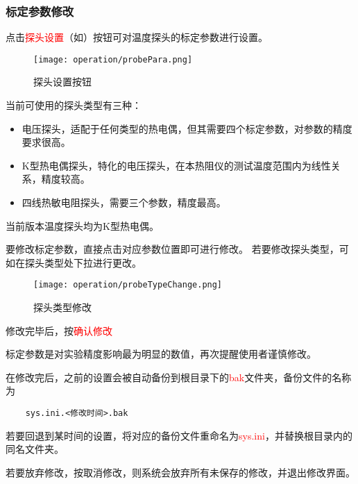 \subsubsection*{标定参数修改}
点击\textcolor{red}{探头设置}（如）按钮可对温度探头的标定参数进行设置。
\begin{figure}[H]
    \centering
    \texttt{[image: operation/probePara.png]}
    \caption{  探头设置按钮 \label{fig:btnProbePara}}
\end{figure}
当前可使用的探头类型有三种：
\begin{itemize}
    \item 电压探头，适配于任何类型的热电偶，但其需要四个标定参数，对参数的精度要求很高。
    \item K型热电偶探头，特化的电压探头，在本热阻仪的测试温度范围内为线性关系，精度较高。
    \item 四线热敏电阻探头，需要三个参数，精度最高。
\end{itemize}
\begin{note}
    当前版本温度探头均为K型热电偶。
\end{note}
要修改标定参数，直接点击对应参数位置即可进行修改。
若要修改探头类型，可如在探头类型处下拉进行更改。
\begin{figure}[H]
    \centering
    \texttt{[image: operation/probeTypeChange.png]}
    \caption{  探头类型修改 \label{fig:probeTypeChange}}
\end{figure}
修改完毕后，按\textcolor{red}{确认修改}
\begin{note}
    标定参数是对实验精度影响最为明显的数值，再次提醒使用者谨慎修改。
\end{note}
在修改完后，之前的设置会被自动备份到根目录下的\textcolor{red}{bak}文件夹，备份文件的名称为
\begin{lstlisting}
    sys.ini.<修改时间>.bak
\end{lstlisting}
若要回退到某时间的设置，将对应的备份文件重命名为\textcolor{red}{sys.ini}，并替换根目录内的同名文件夹。
\par 若要放弃修改，按取消修改，则系统会放弃所有未保存的修改，并退出修改界面。
